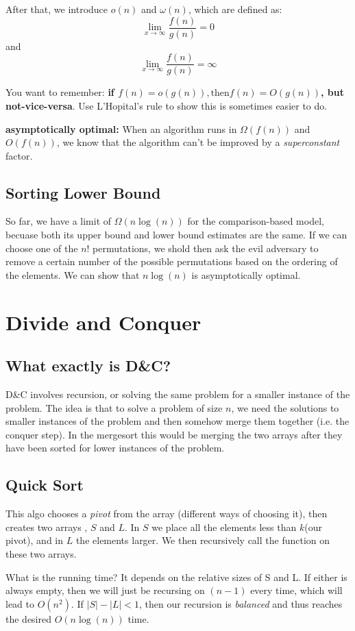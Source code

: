 \documentclass[portrait,10pt, a4paper]{article}
\begin{document}
\begin{multicols*}{3}
			After that, we introduce $o(n)$ and $\omega(n)$, which are defined as:
			\[ \lim_{x\to\infty}\frac{f(n)}{g(n)} = 0\] and 
			\[ \lim_{x\to\infty}\frac{f(n)}{g(n)} = \infty\]
				
			You want to remember: \textbf{if $f(n)=o(g(n)),\text{then} f(n)=O(g(n))$, but not-vice-versa}. Use L'Hopital's
			rule to show this is sometimes easier to do.

			\textbf{asymptotically optimal:} When an algorithm runs in $\Omega(f(n))$ and $O(f(n))$, we know that the 
			algorithm can't be improved by a \textit{superconstant} factor.
		\subsection{Sorting Lower Bound}
			So far, we have a limit of $\Omega(n\log(n))$ for the comparison-based model, becuase both its upper bound and
			lower bound estimates are the same. If we can choose one of the $n!$ permutations, we shold then ask the 
			evil adversary to remove  a certain number of the possible permutations based on the ordering of the elements.
			We can show that $n\log(n)$ is asymptotically optimal.
\section{Divide and Conquer}
	\subsection{What exactly is D\&C?}
		D\&C  involves recursion, or solving the same problem for a smaller instance of the problem. The idea is 
		that to solve a problem of size $n$, we need the solutions to smaller instances of the problem and then 
		somehow merge them together (i.e. the conquer step). In the mergesort this would be merging the two
		arrays after they have been sorted for lower instances of the problem.
	\subsection{Quick Sort}
		This algo chooses a \textit{pivot} from the array (different ways of choosing it), then creates two arrays
		, $S$ and $L$. In $S$ we place all the elements less than $k$(our pivot), and in $L$ the elements larger.
		We then recursively call the function on these two arrays.

		What is the running time? It depends on the relative sizes of S and L. If either is always empty, then
		we will just be recursing on $(n-1)$ every time, which will lead to $O(n^{2})$. If $|S|-|L|<1$, then our 
		recursion is \textit{balanced} and thus reaches the desired $O(n\log(n))$ time.


\end{multicols*}
\end{document}
